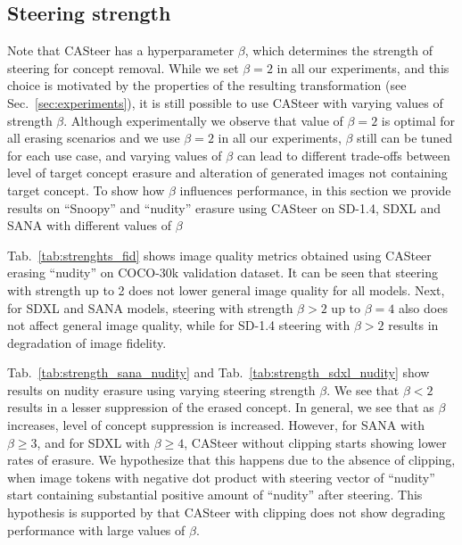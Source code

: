 


\subsection{Steering strength}
\label{sec:ablation_strength}
Note that CASteer has a hyperparameter $\beta$, which determines the strength of steering for concept removal. While we set $\beta=2$ in all our experiments, and this choice is motivated by the properties of the resulting transformation (see Sec.~\ref{sec:experiments}), it is still possible to use CASteer with varying values of strength $\beta$. Although experimentally we observe that value of $\beta=2$ is optimal for all erasing scenarios and we use $\beta=2$ in all our experiments, $\beta$ still can be tuned for each use case, and varying values of $\beta$ can lead to different trade-offs between level of target concept erasure and alteration of generated images not containing target concept. To show how $\beta$ influences performance, in this section we provide results on ``Snoopy'' and ``nudity'' erasure using CASteer on SD-1.4, SDXL and SANA with different values of $\beta$ 

Tab.~\ref{tab:strenghts_fid} shows image quality metrics obtained using CASteer erasing ``nudity'' on COCO-30k validation dataset. It can be seen that steering with strength up to 2 does not lower general image quality for all models. Next, for SDXL and SANA models, steering with strength $\beta>2$ up to $\beta=4$ also does not affect general image quality, while for SD-1.4 steering with $\beta>2$ results in degradation of image fidelity. 

Tab.~\ref{tab:strength_sana_nudity} and Tab.~\ref{tab:strength_sdxl_nudity} show results on nudity erasure using varying steering strength $\beta$. We see that $\beta<2$ results in a lesser suppression of the erased concept. 
In general, we see that as $\beta$ increases, level of concept suppression is increased. However, for SANA with $\beta \geqslant 3$, and for SDXL with $\beta \geqslant 4$, CASteer without clipping starts showing lower rates of erasure. We hypothesize that this happens due to the absence of clipping, when image tokens with negative dot product with steering vector of ``nudity'' start containing substantial positive amount of ``nudity'' after steering. This hypothesis is supported by that CASteer with clipping does not show degrading performance with large values of $\beta$.



